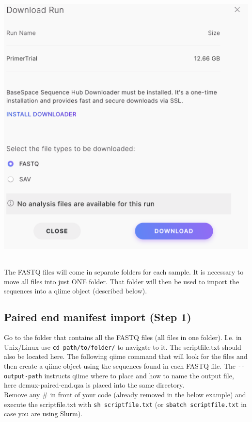 \documentclass[
]{book}
\begin{document}
\includegraphics{./img/basespacedownload2.png}\\
\strut \\

The FASTQ files will come in separate folders for each sample. It is necessary to move all files into just ONE folder. That folder will then be used to import the sequences into a qiime object (described below).

\hypertarget{paired-end-manifest-import-step-1}{%
\subsection{Paired end manifest import (Step 1)}\label{paired-end-manifest-import-step-1}}

Go to the folder that contains all the FASTQ files (all files in one folder). I.e. in Unix/Linux use \texttt{cd\ path/to/folder/} to navigate to it. The scriptfile.txt should also be located here. The following qiime command that will look for the files and then create a qiime object using the sequences found in each FASTQ file. The \texttt{-\/-output-path} instructs qiime where to place and how to name the output file, here demux-paired-end.qza is placed into the same directory.\\
Remove any \# in front of your code (already removed in the below example) and execute the scriptfile.txt with \texttt{sh\ scriptfile.txt} (or \texttt{sbatch\ scriptfile.txt} in case you are using Slurm).
\end{document}
